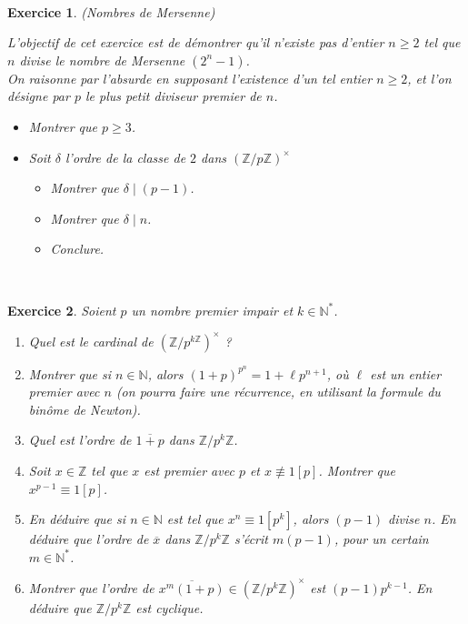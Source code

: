 \documentclass[11pt,a4paper]{article}
\newtheorem{ex}{Exercice}
\newcommand{\N}{\mathbb{N}}
\newcommand{\Z}{\mathbb{Z}}
\begin{document}
\




\begin{ex}\label{nombre_mersenne}(Nombres de Mersenne) \

L'objectif de cet exercice est de démontrer qu'il n'existe pas d'entier $n \geqslant 2$ tel que $n$ divise le nombre de Mersenne $(2^n-1) $.\\
On raisonne par l'absurde en supposant l'existence d'un tel entier $n \geqslant 2$, et l'on désigne par $p$ le plus petit diviseur premier de $n$. 
\begin{itemize}
\item[$1.$] Montrer que $p \geqslant 3  $.
\item[$2.$] Soit $\delta$ l'ordre de la classe de $2$ dans $( \mathbb{Z}/p \mathbb{Z} )^{\times} $
\begin{itemize}
\item[$a)$] Montrer que $\delta \mid (p-1)$.
\item[$b)$] Montrer que $ \delta \mid n$.
\item[$c)$] Conclure.
\end{itemize}
\end{itemize}


\end{ex}

\
\begin{ex}\label{cyclicite_Z_pkZ}
Soient $p$ un nombre premier impair et $k\in \N^*$. 
\begin{enumerate}
\item Quel est le cardinal de $(\Z/p^{k\Z})^\times$ ?

\item Montrer que si $n\in \N$, alors $(1+p)^{p^n}=1+\ell p^{n+1}$, où $\ell$ est un entier premier avec $n$ (on pourra faire une récurrence, en utilisant la formule du binôme de Newton).

\item Quel est l'ordre de $\overline{1+p}$ dans $\Z/p^{k}\Z$.

\item Soit $x\in \Z$ tel que $x$ est premier avec $p$ et $x\not\equiv 1[p]$. Montrer que $x^{p-1}\equiv 1[p]$. 

\item En déduire que si $n\in \N$ est tel que $x^n\equiv 1[ p^k]$, alors $(p-1)$ divise $n$. En déduire que l'ordre de $\overline{x}$ dans $\Z/p^{k}\Z$ s'écrit $m(p-1)$, pour un certain $m\in  \N^*$.

\item Montrer que l'ordre de $\overline{x^m(1+p)}\in (\Z/p^k\Z)^\times$ est $(p-1)p^{k-1}$. En déduire que $\Z/p^k\Z$ est cyclique.
\end{enumerate}
\end{ex}
\end{document}
